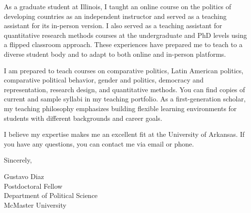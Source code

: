 \documentclass[
  12pt,
]{letter}
\begin{document}
\begin{letter}{}
As a graduate student at Illinois, I taught an online course on the
politics of developing countries as an independent instructor and served
as a teaching assistant for its in-person version. I also served as a
teaching assistant for quantitative research methods courses at the
undergraduate and PhD levels using a flipped classroom approach. These
experiences have prepared me to teach to a diverse student body and to
adapt to both online and in-person platforms.

I am prepared to teach courses on comparative politics, Latin American
politics, comparative political behavior, gender and politics, democracy
and representation, research design, and quantitative methods. You can
find copies of current and sample syllabi in my teaching portfolio. As a
first-generation scholar, my teaching philosophy emphasizes building
flexible learning environments for students with different backgrounds
and career goals.

I believe my expertise makes me an excellent fit at the University of
Arkansas. If you have any questions, you can contact me via email or
phone.

Sincerely,

Gustavo Diaz\\
Postdoctoral Fellow\\
Department of Political Science\\
McMaster University



\vfill
\end{letter}
\end{document}
